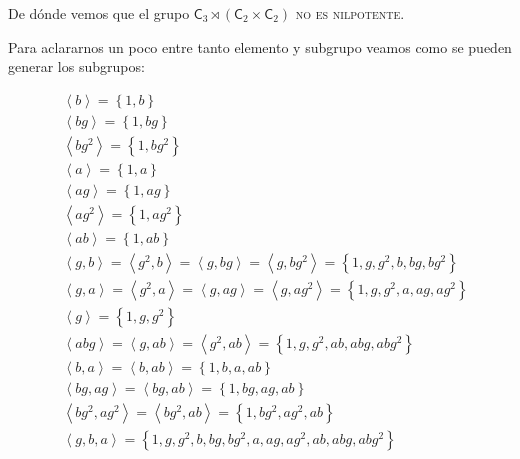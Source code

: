 \documentclass[12pt,a4paper,fleqn,spanish,final,openright]{extbook}
\theoremstyle{definition}
\theoremstyle{remark}
\begin{document}
De dónde vemos que el grupo
${\mathsf{C}_{3}}\rtimes({\mathsf{C}_{2}}   \times   {\mathsf{C}_{2}})$ \textsc{no es nilpotente}.

Para aclararnos un poco entre tanto elemento y subgrupo veamos como se pueden generar los
subgrupos:

\begin{align*}
&{\left\langle{b}\right\rangle} = {\left\lbrace{1,b}\right\rbrace}\\
&{\left\langle{bg}\right\rangle} = {\left\lbrace{1,bg}\right\rbrace}\\
&{\left\langle{bg^2}\right\rangle} = {\left\lbrace{1,bg^2}\right\rbrace}\\
&{\left\langle{a}\right\rangle} = {\left\lbrace{1,a}\right\rbrace}\\
&{\left\langle{ag}\right\rangle} = {\left\lbrace{1,ag}\right\rbrace}\\
&{\left\langle{ag^2}\right\rangle} = {\left\lbrace{1,ag^2}\right\rbrace}\\
&{\left\langle{ab}\right\rangle} = {\left\lbrace{1,ab}\right\rbrace}\\
&{\left\langle{g,b}\right\rangle} = {\left\langle{g^2,b}\right\rangle} = {\left\langle{g,bg}\right\rangle} = {\left\langle{g,bg^2}\right\rangle} = {\left\lbrace{1,g,g^2,b,bg,bg^2}\right\rbrace}\\
&{\left\langle{g,a}\right\rangle} = {\left\langle{g^2,a}\right\rangle} ={\left\langle{g,ag}\right\rangle} = {\left\langle{g,ag^2}\right\rangle} = {\left\lbrace{1,g,g^2,a,ag,ag^2}\right\rbrace}\\
&{\left\langle{g}\right\rangle} = {\left\lbrace{1,g,g^2}\right\rbrace}\\
&{\left\langle{abg}\right\rangle} =
{\left\langle{g,ab}\right\rangle} = {\left\langle{g^2,ab}\right\rangle} =
{\left\lbrace{1,g,g^2,ab,abg,abg^2}\right\rbrace}\\
&{\left\langle{b,a}\right\rangle} = {\left\langle{b,ab}\right\rangle} = {\left\lbrace{1,b,a,ab}\right\rbrace}\\
&{\left\langle{bg,ag}\right\rangle} = {\left\langle{bg,ab}\right\rangle} = {\left\lbrace{1,bg,ag,ab}\right\rbrace}\\
&{\left\langle{bg^2,ag^2}\right\rangle} = {\left\langle{bg^2,ab}\right\rangle} = {\left\lbrace{1,bg^2,ag^2,ab}\right\rbrace}\\
&{\left\langle{g,b,a}\right\rangle} = {\left\lbrace{1,g,g^2,b,bg,bg^2,a,ag,ag^2,ab,abg,abg^2}\right\rbrace}
\end{align*}
\end{document}
